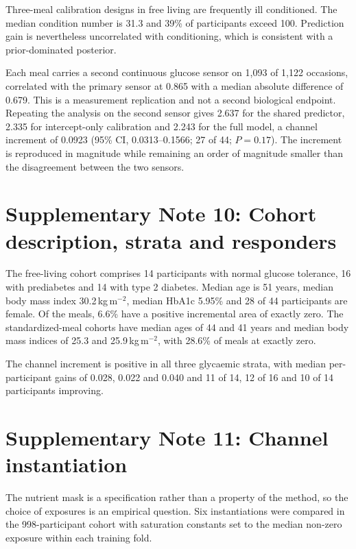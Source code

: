 \documentclass[10pt]{article}
\begin{document}
Three-meal calibration designs in free living are frequently ill conditioned. The median condition
number is 31.3 and 39\% of participants exceed 100. Prediction gain is nevertheless uncorrelated
with conditioning, which is consistent with a prior-dominated posterior.

Each meal carries a second continuous glucose sensor on 1{,}093 of 1{,}122 occasions, correlated
with the primary sensor at 0.865 with a median absolute difference of 0.679. This is a measurement
replication and not a second biological endpoint. Repeating the analysis on the second sensor gives
2.637 for the shared predictor, 2.335 for intercept-only calibration and 2.243 for the full model,
a channel increment of 0.0923 (95\% CI, 0.0313--0.1566; 27 of 44; $P=0.17$). The increment is
reproduced in magnitude while remaining an order of magnitude smaller than the disagreement
between the two sensors.


\clearpage

\section*{Supplementary Note 10: Cohort description, strata and responders}

The free-living cohort comprises 14 participants with normal glucose tolerance, 16 with
prediabetes and 14 with type 2 diabetes. Median age is 51 years, median body mass index
30.2\,kg\,m$^{-2}$, median HbA1c 5.95\% and 28 of 44 participants are female. Of the meals, 6.6\%
have a positive incremental area of exactly zero. The standardized-meal cohorts have median ages
of 44 and 41 years and median body mass indices of 25.3 and 25.9\,kg\,m$^{-2}$, with 28.6\% of
meals at exactly zero.

The channel increment is positive in all three glycaemic strata, with median per-participant gains
of 0.028, 0.022 and 0.040 and 11 of 14, 12 of 16 and 10 of 14 participants improving.



\clearpage

\section*{Supplementary Note 11: Channel instantiation}

The nutrient mask is a specification rather than a property of the method, so the choice of
exposures is an empirical question. Six instantiations were compared in the 998-participant cohort
with saturation constants set to the median non-zero exposure within each training fold.
\end{document}
